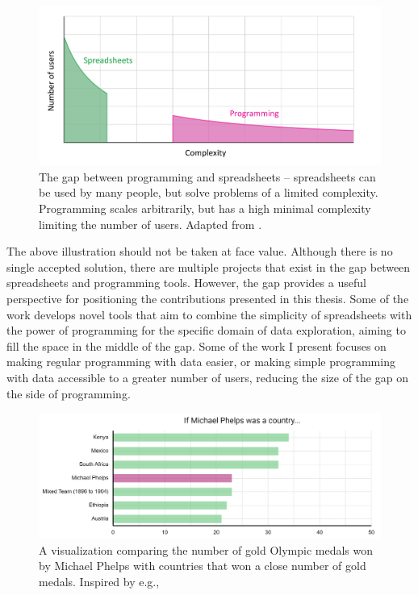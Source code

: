 \documentclass[fleqn,11pt]{report}
\theoremstyle{definition}
\begin{document}
\begin{figure}[h!]
\centering
\includegraphics[scale=0.25]{img/gap.png}
\vspace{-0.5em}
\caption{The gap between programming and spreadsheets -- spreadsheets can be used by many people,
but solve problems of a limited complexity. Programming scales arbitrarily, but has a high minimal
complexity limiting the number of users. Adapted from \citet{edwards-2015-transcript}.}
\label{fig:gap}
\end{figure}

The above illustration should not be taken at face value. Although there is no single accepted
solution, there are multiple projects that exist in the gap between spreadsheets and programming
tools. However, the gap provides a useful perspective for positioning the contributions presented
in this thesis. Some of the work develops novel tools that aim to combine the simplicity of
spreadsheets with the power of programming for the specific domain of data exploration, aiming to
fill the space in the middle of the gap. Some of the work I present focuses on making regular
programming with data easier, or making simple programming with data accessible to a greater
number of users, reducing the size of the gap on the side of programming.

\begin{figure}[t]
\includegraphics[scale=0.345]{img/phelps.png}
\caption{A visualization comparing the number of gold Olympic medals won by Michael Phelps
 with countries that won a close number of gold medals. Inspired by e.g., \cite{npr-2016-phelps}}
\label{fig:phelps}
\end{figure}
\end{document}
